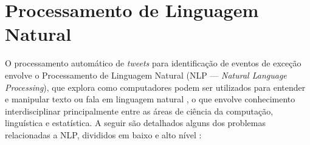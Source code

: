 \documentclass[
	12pt,				%
	oneside,			%
	a4paper,			%
	english,			%
	brazil				%
	]{abntex2ppgsi}
\begin{document}
{\section{Processamento de Linguagem Natural}
\label{nlp}

O processamento automático de \textit{tweets} para identificação de eventos de exceção envolve o Processamento de Linguagem Natural (NLP --- \textit{Natural Language Processing}), que explora como computadores podem ser utilizados para entender e manipular texto ou fala em linguagem natural \cite{liu2017roadmap}, o que envolve conhecimento interdisciplinar principalmente entre as áreas de ciência da computação, linguística e estatística. A seguir são detalhados alguns dos problemas relacionadas a NLP, divididos em baixo e alto nível \cite{nadkarni2011natural}:

}
\end{document}

